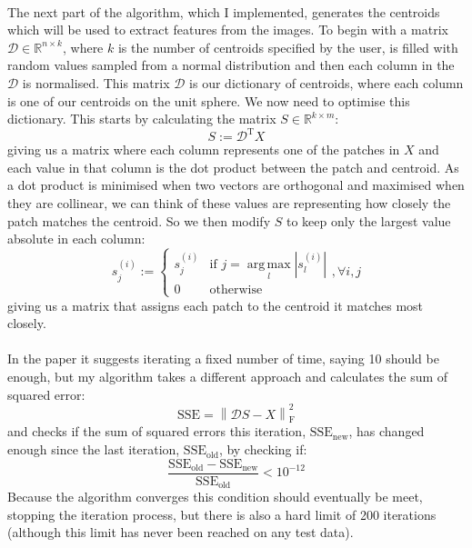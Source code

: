 \documentclass{article}
\DeclareMathOperator*{\argmax}{arg\,max}
\begin{document}
\paragraph*{}

The next part of the algorithm, which I implemented, generates the centroids which will be used to extract features from the images. To begin with a matrix $\mathcal{D} \in \mathbb{R}^{n \times k}$, where $k$ is the number of centroids specified by the user, is filled with random values sampled from a normal distribution and then each column in the $\mathcal{D}$ is normalised. This matrix $\mathcal{D}$ is our dictionary of centroids, where each column is one of our centroids on the unit sphere. We now need to optimise this dictionary. This starts by calculating the matrix $S \in \mathbb{R}^{k \times m}$:
\[
S := \mathcal{D}^{\mathrm{T}} X
\]
giving us a matrix where each column represents one of the patches in $X$ and each value in that column is the dot product between the patch and centroid. As a dot product is minimised when two vectors are orthogonal and maximised when they are collinear, we can think of these values are representing how closely the patch matches the centroid. So we then modify $S$ to keep only the largest value absolute in each column:
\[
s^{(i)}_{j} := 
\begin{cases}
s^{(i)}_j & \textrm{if } j = \argmax\limits_{l} \left| s^{(i)}_l \right| \\
0 & \textrm{otherwise}
\end{cases}
, \forall i,j
\]
giving us a matrix that assigns each patch to the centroid it matches most closely.

\paragraph{}

In the paper it suggests iterating a fixed number of time, saying 10 should be enough, but my algorithm takes a different approach and calculates the sum of squared error:
\[
\mathrm{SSE} = \left\lVert \mathcal{D}S - X \right\rVert_{\mathrm{F}}^{2}
\]
and checks if the sum of squared errors this iteration, $\mathrm{SSE_{new}}$, has changed enough since the last iteration, $\mathrm{SSE_{old}}$, by checking if:
\[
\frac{\mathrm{SSE_{old}} - \mathrm{SSE_{new}}}{\mathrm{SSE_{old}}} < 10^{-12}
\]
Because the algorithm converges this condition should eventually be meet, stopping the iteration process, but there is also a hard limit of 200 iterations (although this limit has never been reached on any test data).
\end{document}
